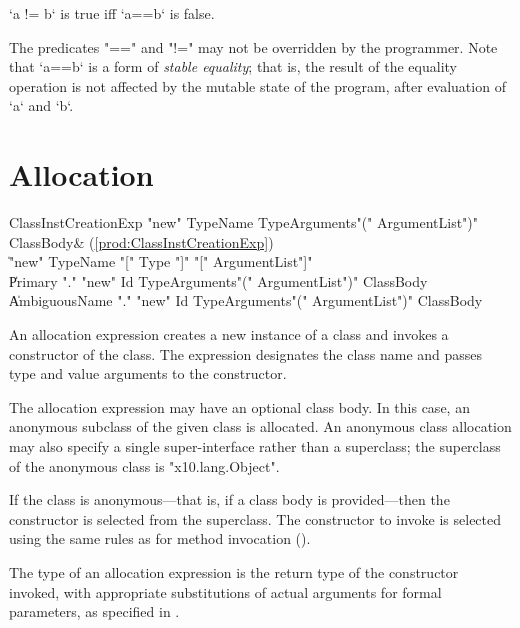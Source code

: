 \xcd`a != b`
is true iff \xcd`a==b` is false.

The predicates \xcd"==" and \xcd"!=" may not be overridden by the programmer.
Note that \xcd`a==b` is a form of \emph{stable equality}; that is, the result of
the equality operation is not affected by the mutable state of the program,
after evaluation of \xcd`a` and \xcd`b`. 


\section{Allocation}
\label{ClassCreation}

\begin{bbgrammar}
ClassInstCreationExp \: \xcd"new" TypeName TypeArguments\opt \xcd"(" ArgumentList\opt \xcd")" ClassBody\opt & (\ref{prod:ClassInstCreationExp}) \\
                    \| \xcd"new" TypeName \xcd"[" Type \xcd"]" \xcd"[" ArgumentList\opt \xcd"]" \\
                    \| Primary \xcd"." \xcd"new" Id TypeArguments\opt \xcd"(" ArgumentList\opt \xcd")" ClassBody\opt \\
                    \| AmbiguousName \xcd"." \xcd"new" Id TypeArguments\opt \xcd"(" ArgumentList\opt \xcd")" ClassBody\opt \\
\end{bbgrammar}

An allocation expression creates a new instance of a class and
invokes a constructor of the class.
The expression designates the class name and passes
type and value arguments to the constructor.

The allocation expression may have an optional class body.
In this case, an anonymous subclass of the given class is
allocated.   An anonymous class allocation may also specify a
single super-interface rather than a superclass; the superclass
of the anonymous class is \xcd"x10.lang.Object".

If the class is anonymous---that is, if a class body is
provided---then the constructor is selected from the superclass.
The constructor to invoke is selected using the same rules as
for method invocation ().

The type of an allocation expression
is the return type of the constructor invoked, with appropriate
substitutions  of actual arguments for formal parameters, as
specified in .

